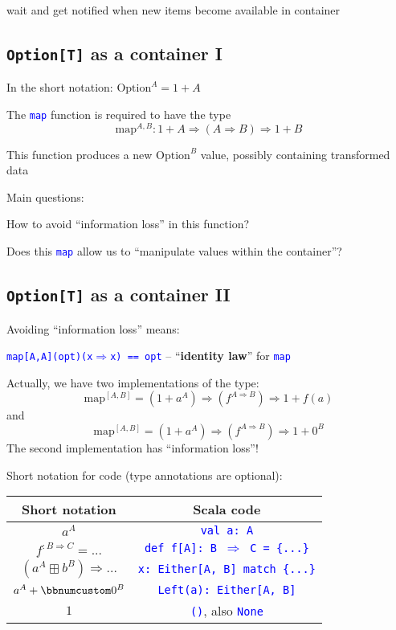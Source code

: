 wait and get notified when new items become available in container


\subsection{\texttt{Option{[}T{]}} as a container I}

In the short notation: $\text{Option}^{A}=1+A$

The \texttt{\textcolor{blue}{\footnotesize{}map}} function is required
to have the type
\[
\text{map}^{A,B}:1+A\Rightarrow\left(A\Rightarrow B\right)\Rightarrow1+B
\]

This function produces a new $\text{Option}^{B}$ value, possibly
containing transformed data

Main questions:

How to avoid ``information loss'' in this function?

Does this \texttt{\textcolor{blue}{\footnotesize{}map}} allow us to
``manipulate values within the container''?


\subsection{\texttt{Option{[}T{]}} as a container II}

Avoiding ``information loss'' means:

\texttt{\textcolor{blue}{\footnotesize{}map{[}A,A{]}(opt)(x$\Rightarrow$x)
== opt}} – ``\textbf{identity law}'' for \texttt{\textcolor{blue}{\footnotesize{}map}}{\footnotesize\par}

Actually, we have two implementations of the type: 
\[
\text{map}^{[A,B]}=(1+a^{A})\Rightarrow(f^{A\Rightarrow B})\Rightarrow1+f(a)
\]
and
\[
\text{map}^{[A,B]}=(1+a^{A})\Rightarrow(f^{A\Rightarrow B})\Rightarrow1+0^{B}
\]
The second implementation has ``information loss''!

Short notation for code (type annotations are optional):
\begin{center}
\begin{tabular}{|c|c|}
\hline 
\textbf{Short notation} & \textbf{Scala code}\tabularnewline
\hline 
\hline 
$a^{A}$ & \texttt{\textcolor{blue}{\footnotesize{}val a: A}}\tabularnewline
\hline 
$f^{:B\Rightarrow C}=...$ & \texttt{\textcolor{blue}{\footnotesize{}def f{[}A{]}: B $\Rightarrow$
C = \{...\}}}\tabularnewline
\hline 
$(a^{A}\boxplus b^{B})\Rightarrow...$ & \texttt{\textcolor{blue}{\footnotesize{}x: Either{[}A, B{]} match
\{...\}}}\tabularnewline
\hline 
$a^{A}+\bbnum 0^{B}$ & \texttt{\textcolor{blue}{\footnotesize{}Left(a):\ Either{[}A, B{]}}}\tabularnewline
\hline 
$1$ & \texttt{\textcolor{blue}{\footnotesize{}()}}, also \texttt{\textcolor{blue}{\footnotesize{}None}}\tabularnewline
\hline 
\end{tabular}
\par\end{center}


